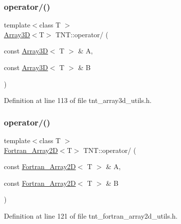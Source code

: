 \subsubsection{\texorpdfstring{operator/()}{operator/()}\hspace{0.1cm}{\footnotesize\ttfamily [2/5]}}
{\footnotesize\ttfamily template$<$class T $>$ \\
\hyperlink{classTNT_1_1Array3D}{Array3D}$<$T$>$ T\+N\+T\+::operator/ (\begin{DoxyParamCaption}\item[{const \hyperlink{classTNT_1_1Array3D}{Array3D}$<$ T $>$ \&}]{A,  }\item[{const \hyperlink{classTNT_1_1Array3D}{Array3D}$<$ T $>$ \&}]{B }\end{DoxyParamCaption})}



Definition at line 113 of file tnt\+\_\+array3d\+\_\+utils.\+h.

\mbox{\label{namespaceTNT_adab9ec5a320edda78d7c70db1962b53c}} 
\subsubsection{\texorpdfstring{operator/()}{operator/()}\hspace{0.1cm}{\footnotesize\ttfamily [3/5]}}
{\footnotesize\ttfamily template$<$class T $>$ \\
\hyperlink{classTNT_1_1Fortran__Array2D}{Fortran\+\_\+\+Array2D}$<$T$>$ T\+N\+T\+::operator/ (\begin{DoxyParamCaption}\item[{const \hyperlink{classTNT_1_1Fortran__Array2D}{Fortran\+\_\+\+Array2D}$<$ T $>$ \&}]{A,  }\item[{const \hyperlink{classTNT_1_1Fortran__Array2D}{Fortran\+\_\+\+Array2D}$<$ T $>$ \&}]{B }\end{DoxyParamCaption})}



Definition at line 121 of file tnt\+\_\+fortran\+\_\+array2d\+\_\+utils.\+h.

\mbox{\label{namespaceTNT_af2275486defb3aa682168d59c8b5fefa}} 

